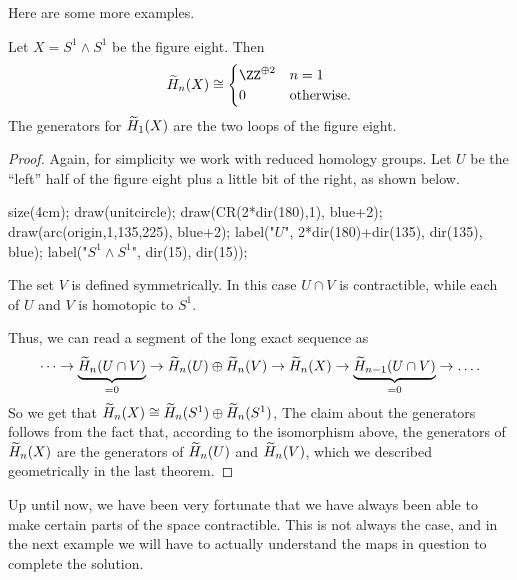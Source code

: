 Here are some more examples.
\begin{proposition}
	Let $X = S^1 \wedge S^1$ be the figure eight.
	Then
	\[
		\wt H_n(X) \cong
		\begin{cases}
			\ZZ^{\oplus 2} & n = 1 \\
			0 & \text{otherwise}.
		\end{cases}
	\]
	The generators for $\widetilde H_1(X)$ are the two loops of the figure eight.
\end{proposition}
\begin{proof}
	Again, for simplicity we work with reduced homology groups.
	Let $U$ be the ``left'' half of the figure eight plus a little bit of the right,
	as shown below.
	\begin{center}
		\begin{asy}
			size(4cm);
			draw(unitcircle);
			draw(CR(2*dir(180),1), blue+2);
			draw(arc(origin,1,135,225), blue+2);
			label("$U$", 2*dir(180)+dir(135), dir(135), blue);
			label("$S^1 \wedge S^1$", dir(15), dir(15));
		\end{asy}
	\end{center}
	The set $V$ is defined symmetrically.
	In this case $U \cap V$ is contractible, while each of $U$ and $V$
	is homotopic to $S^1$.

	Thus, we can read a segment of the long exact sequence as
	\[
		\dots \to
		\underbrace{\widetilde H_n(U \cap V)}_{=0}
		\to \widetilde H_n(U) \oplus \widetilde H_n(V) \to \widetilde H_n(X) \to 
		\underbrace{\widetilde H_{n-1}(U \cap V)}_{=0} \to \dots.
	\]
	So we get that $\widetilde H_n(X) \cong \widetilde H_n(S^1) \oplus \widetilde H_n(S^1)$,
	The claim about the generators follows from the fact that, 
	according to the isomorphism above,
	the generators of $\widetilde H_n(X)$ are the generators of $\widetilde H_n(U)$
	and $\widetilde H_n(V)$, which we described geometrically
	in the last theorem.
\end{proof}

Up until now, we have been very fortunate that we have always been able to make
certain parts of the space contractible.
This is not always the case, and in the next example we will have to
actually understand the maps in question to complete the solution.

